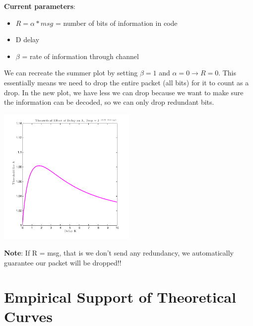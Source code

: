 \documentclass[leqno,twocolumn]{article}
\begin{document}
\textbf{Current parameters}:
\begin{itemize}
\item $R = \alpha * msg$ = number of bits of information in code
\item D delay
\item $\beta$ = rate of information through channel
\end{itemize}

We can recreate the summer plot by setting $\beta = 1$ and $\alpha = 0 \rightarrow R = 0$. This essentially means we need to drop the entire packet (all bits) for it to count as a drop. In the new plot, we have less we can drop because we want to make sure the information can be decoded, so we can only drop redundant bits.

\begin{center}
\includegraphics[width=0.5\textwidth]{newcode_oldplot}
\end{center}

\textbf{Note}: If R = msg, that is we don't send any redundancy, we automatically guarantee our packet will be dropped!!

\section{Empirical Support of Theoretical Curves}
\end{document}
